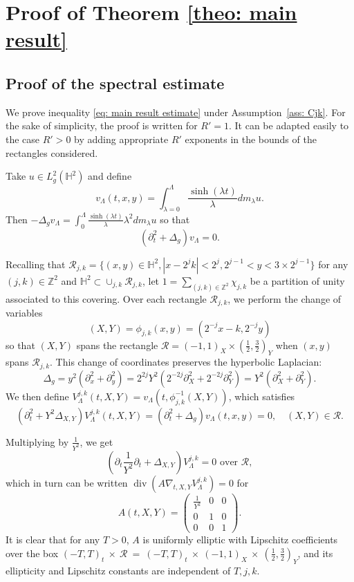 \documentclass[letterpaper,11pt]{amsart}
\theoremstyle{note}
\numberwithin{equation}{section}
\DeclareMathOperator{\Div}{div}
\begin{document}
\section{Proof of Theorem \ref{theo: main result}}

\subsection{Proof of the spectral estimate}
\label{sec: proof main result}

We prove inequality \eqref{eq: main result estimate} under Assumption~\ref{ass: Cjk}. For the sake of simplicity, the proof is written for $R' = 1$. It can be adapted easily to the case $R' > 0$ by adding appropriate $R'$ exponents in the bounds of the rectangles considered.

Take $u \in L^2_g(\mathbb{H}^2)$ and define $$v_\Lambda(t, x, y) = \int_{\lambda = 0}^\Lambda \frac{\sinh(\lambda t)}{ \lambda} dm_\lambda u.$$ Then $-\Delta_g v_\Lambda = \int_0^\Lambda \frac{\sinh(\lambda t)}{\lambda} \lambda^2 dm_\lambda u$ so that $$(\partial_t^2 + \Delta_g) v_\Lambda = 0.$$

Recalling that $\mathcal{R}_{j,k} = \{(x,y) \in \mathbb{H}^2, |x - 2^j k| < 2^j, 2^{j-1} < y < 3 \times 2^{j-1} \}$ for any $(j, k) \in \mathbb{Z}^2$ and $\mathbb{H}^2 \subset \cup_{j,k} \mathcal{R}_{j,k}$, let $1 = \sum_{(j,k) \in \mathbb{Z}^2} \chi_{j,k}$ be a partition of unity associated to this covering.  Over each rectangle $\mathcal{R}_{j,k}$, we perform the change of variables $$(X, Y) = \phi_{j,k}(x,y) = (2^{-j}x - k, 2^{-j}y)$$ so that $(X, Y)$ spans the rectangle $\mathcal{R} = (-1, 1)_X \times (\frac{1}{2}, \frac{3}{2})_Y$ when $(x, y)$ spans $\mathcal{R}_{j,k}$. This change of coordinates preserves the hyperbolic Laplacian: $$\Delta_g = y^2(\partial_x^2 + \partial_y^2) = 2^{2j}Y^2(2^{-2j}\partial_X^2 + 2^{-2j}\partial_Y^2) = Y^2(\partial_X^2 + \partial_Y^2).$$ We then define $V_\Lambda^{j,k}(t, X, Y) = v_\Lambda(t, \phi_{j,k}^{-1}(X,Y))$, which satisfies $$(\partial_t^2 + Y^2 \Delta_{X,Y}) V_\Lambda^{j,k}(t, X, Y) = (\partial_t^2 + \Delta_g) v_\Lambda(t, x, y) = 0, \quad (X, Y) \in \mathcal{R}.$$

Multiplying by $\frac{1}{Y^2}$, we get $$(\partial_t \frac{1}{Y^2} \partial_t + \Delta_{X,Y})V_\Lambda^{j,k} = 0 \text{ over } \mathcal{R},$$ which in turn can be written $\Div(A \nabla_{t,X,Y} V_\Lambda^{j,k}) = 0$ for $$A(t,X,Y) = \begin{pmatrix}
    \frac{1}{Y^2} & 0 & 0 \\
    0 & 1 & 0 \\
    0 & 0 & 1
\end{pmatrix}.$$ It is clear that for any $T > 0$, $A$ is uniformly elliptic with Lipschitz coefficients over the box $(-T, T)_t~\times~\mathcal{R}~=~(-T, T)_t~\times~(-1, 1)_X~\times~(\frac{1}{2}, \frac{3}{2})_Y$, and its ellipticity and Lipschitz constants are independent of $T, j, k$.
\end{document}
